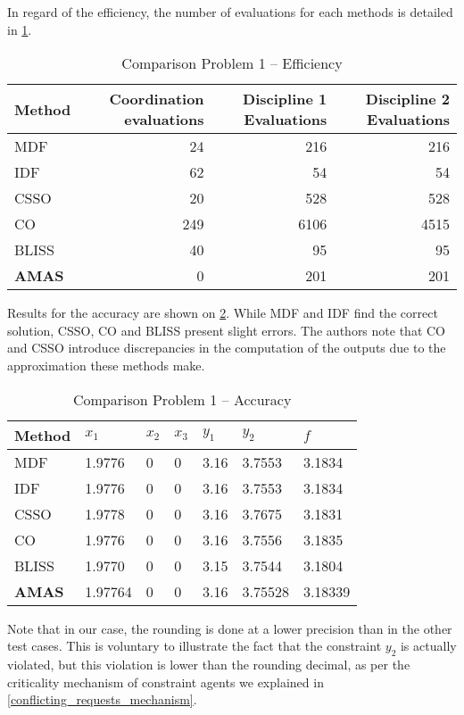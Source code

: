 In regard of the efficiency, the number of evaluations for each methods is detailed in \tablename{} \ref{bench1_efficiency}.

\begin{table}
\caption{Comparison Problem 1 -- Efficiency}\label{bench1_efficiency}
\centering
\begin{tabular}{lrrr}
\toprule
Method & Coordination evaluations & Discipline 1 Evaluations & Discipline 2 Evaluations\\
\midrule
MDF					&	24	&	216		&	216	\\
IDF						&	62	&	54		&	54	\\
CSSO					&	20	&	528		&	528	\\
CO						&	249	&	6106	&	4515	\\
BLISS					&	40	&	95		&	95	\\
\textbf{AMAS}	&	0	&	201	&	201	\\
\bottomrule
\end{tabular}
\end{table}

Results for the accuracy are shown on \tablename{} \ref{bench1_accuracy}. While MDF and IDF find the correct solution, CSSO, CO and BLISS present slight errors. The authors note that CO and CSSO introduce discrepancies in the computation of the outputs due to the approximation these methods make.

\begin{table}
\caption{Comparison Problem 1 -- Accuracy}\label{bench1_accuracy}
\centering
\begin{tabular}{lllllll}
\toprule
Method & $x_1$ & $x_2$ & $x_3$ & $y_1$ & $y_2$ & $f$ \\
\midrule
MDF					&	1.9776	&	0	&	0	&	3.16	&	3.7553	&	3.1834	\\
IDF						&	1.9776	&	0	&	0	&	3.16	&	3.7553	&	3.1834	\\
CSSO					&	1.9778	&	0	&	0	&	3.16	&	3.7675	&	3.1831	\\
CO						&	1.9776	&	0	&	0	&	3.16	&	3.7556	&	3.1835	\\
BLISS					&	1.9770 	&	0	&	0	&	3.15	&	3.7544	&	3.1804	\\
\textbf{AMAS}	&	1.97764	&	0	&	0	&	3.16	&	3.75528	&	3.18339	\\
\bottomrule
\end{tabular}
\end{table}

Note that in our case, the rounding is done at a lower precision than in the other test cases. This is voluntary to illustrate the fact that the constraint $y_2$ is actually violated, but this violation is lower than the rounding decimal, as per the criticality mechanism of constraint agents we explained in \ref{conflicting_requests_mechanism}.

